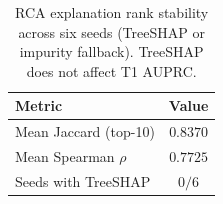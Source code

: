 \begin{table}[!t]
\centering
\caption{RCA explanation rank stability across six seeds (TreeSHAP or impurity fallback). TreeSHAP does not affect T1 AUPRC.}
\label{tab:xai_stability_v4}
{\footnotesize\begin{tabular}{lc}
\toprule
Metric & Value \\
\midrule
Mean Jaccard (top-10) & $0.8370$ \\
Mean Spearman $\rho$ & $0.7725$ \\
Seeds with TreeSHAP & $0/6$ \\
\bottomrule
\end{tabular}}
\end{table}

